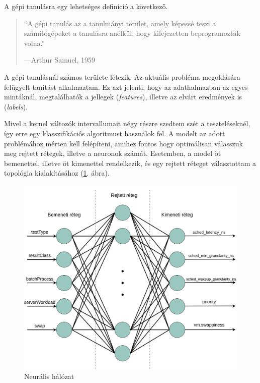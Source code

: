 
A gépi tanulásra egy lehetséges definíció a következő.

\begin{quote}
``A gépi tanulás az a tanulmányi terület, amely képessé teszi a számítógépeket a tanulásra
anélkül, hogy kifejezetten beprogramozták volna.''
\par\nobreak\smallskip\hfill—Arthur Samuel, 1959
\end{quote}

A gépi tanulásnál számos területe létezik. Az aktuális probléma megoldására felügyelt tanítást alkalmaztam. Ez azt jelenti, hogy az adathalmazban az egyes mintáknál, megtalálhatók a jellegek (\textit{features}), illetve az elvárt eredmények is (\textit{labels}).

Mivel a kernel változók intervallumait négy részre szedtem szét a teszteléseknél, így erre egy klasszifikációs algoritmust használok fel.
A modelt az adott problémához mérten kell felépíteni, amihez fontos hogy optimálisan válasszuk meg rejtett rétegek, illetve a neuronok számát.
Esetemben, a model öt bemenettel, illetve öt kimenettel rendelkezik, és egy rejtett réteget választottam a topológia kialakításához (\ref{fig:neuralnetwork}. ábra).

\begin{figure}[h!]
\centering
\includegraphics[width=\textwidth]{images/neuralNetwork.png}
\caption{Neurális hálózat}
\label{fig:neuralnetwork}
\end{figure}

